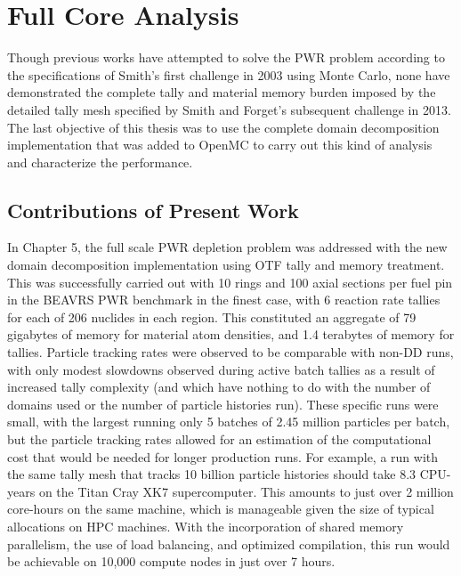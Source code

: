 \section{Full Core Analysis}

Though previous works have attempted to solve the PWR problem according to the
specifications of Smith's first challenge in 2003 using Monte Carlo, none have
demonstrated the complete tally and material memory burden imposed by the
detailed tally mesh specified by Smith and Forget's subsequent challenge in
2013. The last objective of this thesis was to use the complete domain
decomposition implementation that was added to OpenMC to carry out this kind of
analysis and characterize the performance.

\subsection{Contributions of Present Work}

In Chapter 5, the full scale PWR depletion problem was addressed with the new
domain decomposition implementation using OTF tally and memory treatment. This
was successfully carried out with 10 rings and 100 axial sections per fuel pin
in the BEAVRS PWR benchmark in the finest case, with 6 reaction rate tallies
for each of 206 nuclides in each region. This constituted an aggregate of 79
gigabytes of memory for material atom densities, and 1.4 terabytes of memory for
tallies. Particle tracking rates were observed to be comparable with non-DD
runs, with only modest slowdowns observed during active batch tallies as a
result of increased tally complexity (and which have nothing to do with the
number of domains used or the number of particle histories run). These specific
runs were small, with the largest running only 5 batches of 2.45 million
particles per batch, but the particle tracking rates allowed for an estimation
of the computational cost that would be needed for longer production runs. For
example, a run with the same tally mesh that tracks 10 billion particle
histories should take 8.3 CPU-years on the Titan Cray XK7 supercomputer. This
amounts to just over 2 million core-hours on the same machine, which is
manageable given the size of typical allocations on HPC machines. With the
incorporation of shared memory parallelism, the use of load balancing, and
optimized compilation, this run would be achievable on 10,000 compute nodes in
just over 7 hours.


